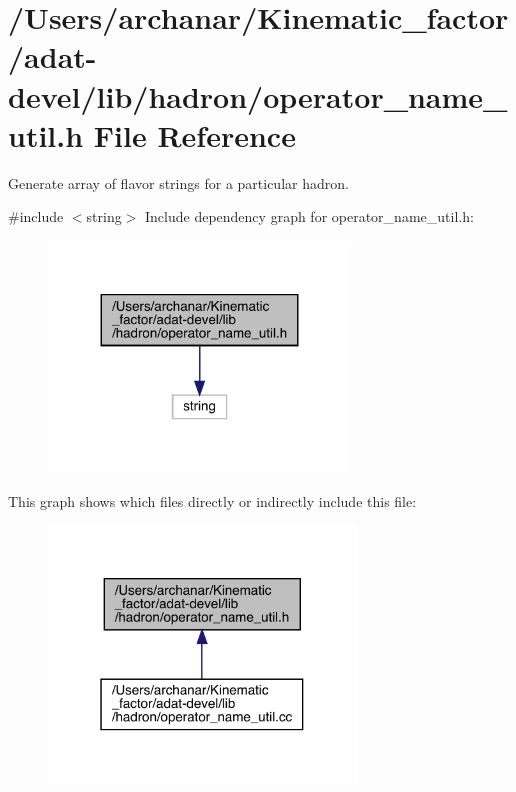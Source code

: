 \hypertarget{adat-devel_2lib_2hadron_2operator__name__util_8h}{}\section{/\+Users/archanar/\+Kinematic\+\_\+factor/adat-\/devel/lib/hadron/operator\+\_\+name\+\_\+util.h File Reference}
\label{adat-devel_2lib_2hadron_2operator__name__util_8h}


Generate array of flavor strings for a particular hadron.  


{\ttfamily \#include $<$string$>$}\newline
Include dependency graph for operator\+\_\+name\+\_\+util.\+h\+:
\nopagebreak
\begin{figure}[H]
\begin{center}
\leavevmode
\includegraphics[width=227pt]{da/dbc/adat-devel_2lib_2hadron_2operator__name__util_8h__incl}
\end{center}
\end{figure}
This graph shows which files directly or indirectly include this file\+:
\nopagebreak
\begin{figure}[H]
\begin{center}
\leavevmode
\includegraphics[width=232pt]{d0/dd6/adat-devel_2lib_2hadron_2operator__name__util_8h__dep__incl}
\end{center}
\end{figure}
